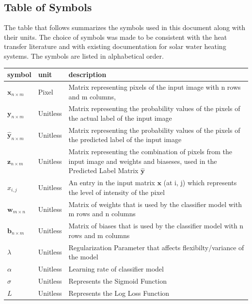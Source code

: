 \documentclass[12pt]{article}
\begin{document}
\subsection{Table of Symbols}

The table that follows summarizes the symbols used in this document along with
their units.  The choice of symbols was made to be consistent with the heat
transfer literature and with existing documentation for solar water heating
systems.  The symbols are listed in alphabetical order.

\renewcommand{\arraystretch}{1.2}
\noindent \begin{longtable*}{l l p{12cm}} \toprule
\textbf{symbol} & \textbf{unit} & \textbf{description}\\
\midrule 
$\mathbf{x}_{n \times m}$ & Pixel & Matrix representing pixels of the input image with n rows and m columns, 
\\
$\mathbf{y}_{n \times m}$ & Unitless & Matrix representing the probability values of the pixels of the actual label of the input image
\\
$\mathbf{\hat{y}}_{n \times m}$ & Unitless & Matrix representing the probability values of the pixels of the predicted label of the input image
\\
$\mathbf{z}_{n \times m}$ & Unitless & Matrix representing the combination of pixels from the input image and weights and biaseses, used in the Predicted Label Matrix $\mathbf{\hat{y}}$
\\
$x_{i,j}$ & Unitless & An entry in the input matrix $\mathbf{x}$ (at i, j) which represents the level of intensity of the pixel
\\
$\mathbf{w}_{m \times n}$ & Unitless & Matrix of weights that is used by the classifier model with m rows and n columns
\\
$\mathbf{b}_{n \times m}$ & Unitless & Matrix of biases that is used by the classifier model with n rows and m columns
\\
$\lambda$ & Unitless & Regularization Parameter that affects flexibilty/variance of the model
\\
$\alpha$ & Unitless & Learning rate of classifier model
\\
$\sigma$ & Unitless & Represents the Sigmoid Function
\\
$L$ & Unitless & Represents the Log Loss Function
\\
\bottomrule
\end{longtable*}
\end{document}
